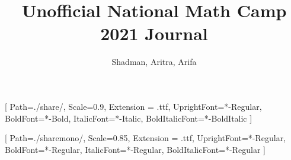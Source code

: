 \usepackage{fontspec}
\usepackage{subfig}
\usepackage{graphicx}
\graphicspath{{pics/}}



\setsansfont{Share}[
    Path=./share/,
    Scale=0.9,
    Extension = .ttf,
    UprightFont=*-Regular,
    BoldFont=*-Bold,
    ItalicFont=*-Italic,
    BoldItalicFont=*-BoldItalic
    ]

\setmonofont{ShareTechMono}[
    Path=./sharemono/,
    Scale=0.85,
    Extension = .ttf,
    UprightFont=*-Regular,
    BoldFont=*-Regular,
    ItalicFont=*-Regular,
    BoldItalicFont=*-Regular
    ]

\usepackage[long,hints]{shuvo}
\usepackage{float}

\usepackage{amsthm}
\theoremstyle{definition}
\newtheorem{prob}{\color{blue!80!black}\sffamily BGD TSTST Problem}
\newtheorem{prop}{\color{blue}\sffamily Property}



\renewcommand{\figurename}{\sffamily\bfseries Figure}





\title{Unofficial National Math Camp 2021 Journal}%

\author{Shadman, Aritra, Arifa}

\date{}
\newcommand{\HRule}{\rule{\linewidth}{0.5mm}}
\setlength\parskip{5pt}
\linespread{1.1}

\newcommand{\addhint}[1]{$\bullet$ {#1}\\}
